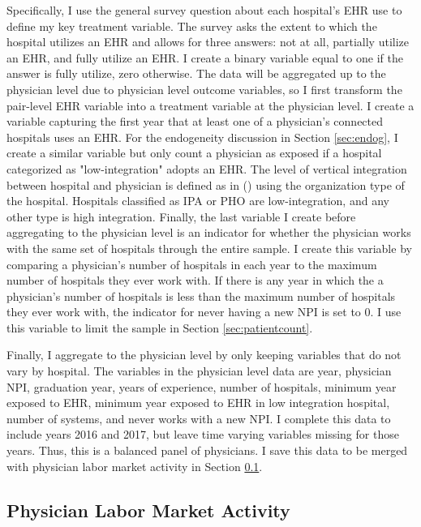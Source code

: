 \documentclass[12pt]{article}
\begin{document}
Specifically, I use the general survey question about each hospital's EHR use to define my key treatment variable. The survey asks the extent to which the hospital utilizes an EHR and allows for three answers: not at all, partially utilize an EHR, and fully utilize an EHR. I create a binary variable equal to one if the answer is fully utilize, zero otherwise. The data will be aggregated up to the physician level due to physician level outcome variables, so I first transform the pair-level EHR variable into a treatment variable at the physician level. I create a variable capturing the first year that at least one of a physician's connected hospitals uses an EHR. For the endogeneity discussion in Section \ref{sec:endog}, I create a similar variable but only count a physician as exposed if a hospital categorized as "low-integration" adopts an EHR. The level of vertical integration between hospital and physician is defined as in \citeauthor{dynan1998assessing} (\citeyear{dynan1998assessing}) using the organization type of the hospital. Hospitals classified as IPA or PHO are low-integration, and any other type is high integration. Finally, the last variable I create before aggregating to the physician level is an indicator for whether the physician works with the same set of hospitals through the entire sample. I create this variable by comparing a physician's number of hospitals in each year to the maximum number of hospitals they ever work with. If there is any year in which the a physician's number of hospitals is less than the maximum number of hospitals they ever work with, the indicator for never having a new NPI is set to 0. I use this variable to limit the sample in Section \ref{sec:patientcount}. 

Finally, I aggregate to the physician level by only keeping variables that do not vary by hospital. The variables in the physician level data are year, physician NPI, graduation year, years of experience, number of hospitals, minimum year exposed to EHR, minimum year exposed to EHR in low integration hospital, number of systems, and never works with a new NPI. I complete this data to include years 2016 and 2017, but leave time varying variables missing for those years. Thus, this is a balanced panel of physicians. I save this data to be merged with physician labor market activity in Section \ref{sec:appmdppas}.

\subsection{Physician Labor Market Activity}\label{sec:appmdppas}
\end{document}
